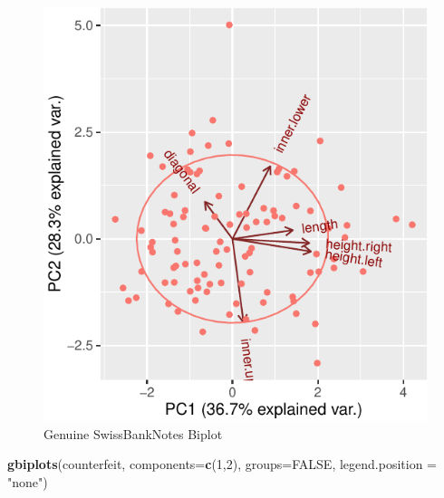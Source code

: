 \documentclass[]{article}
\newenvironment{Shaded}{\begin{snugshade}}{\end{snugshade}}
\newcommand{\KeywordTok}[1]{\textcolor[rgb]{0.13,0.29,0.53}{\textbf{{#1}}}}
\newcommand{\DataTypeTok}[1]{\textcolor[rgb]{0.13,0.29,0.53}{{#1}}}
\newcommand{\DecValTok}[1]{\textcolor[rgb]{0.00,0.00,0.81}{{#1}}}
\newcommand{\StringTok}[1]{\textcolor[rgb]{0.31,0.60,0.02}{{#1}}}
\newcommand{\OtherTok}[1]{\textcolor[rgb]{0.56,0.35,0.01}{{#1}}}
\newcommand{\NormalTok}[1]{{#1}}
\begin{document}
\begin{figure}[htbp]
\centering
\includegraphics{sta546_hw2_files/figure-latex/unnamed-chunk-6-1.pdf}
\caption{Genuine SwissBankNotes Biplot}
\end{figure}

\begin{Shaded}
\begin{Highlighting}[]
\KeywordTok{gbiplots}\NormalTok{(counterfeit, }\DataTypeTok{components=}\KeywordTok{c}\NormalTok{(}\DecValTok{1}\NormalTok{,}\DecValTok{2}\NormalTok{), }\DataTypeTok{groups=}\OtherTok{FALSE}\NormalTok{, }\DataTypeTok{legend.position =} \StringTok{"none"}\NormalTok{)}
\end{Highlighting}
\end{Shaded}
\end{document}
